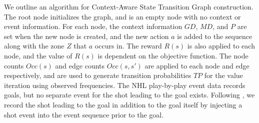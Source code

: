 \documentclass[]{article}
\begin{document}
We outline an algorithm for Context-Aware State Transition Graph construction. The root node initializes the graph, and is an empty node with no context or event information. For each node, the context information $GD$, $MD$, and $P$ are set when the new node is created, and the new action $a$ is added to the sequence along with the zone $Z$ that $a$ occurs in. The reward $R(s)$ is also applied to each node, and the value of $R(s)$ is dependent on the objective function.  The node counts $Occ(s)$ and edge counts $Occ(s,s')$ are applied to each node and edge respectively, and are used to generate transition probabilities $TP$ for the value iteration using observed frequencies. %
The NHL play-by-play event data records goals, but no separate event for the shot leading to the goal exists. Following \citep{Schuckers2013}, we record the shot leading to the goal in addition to the goal itself by injecting a shot event into the event sequence prior to the goal.
\end{document}

